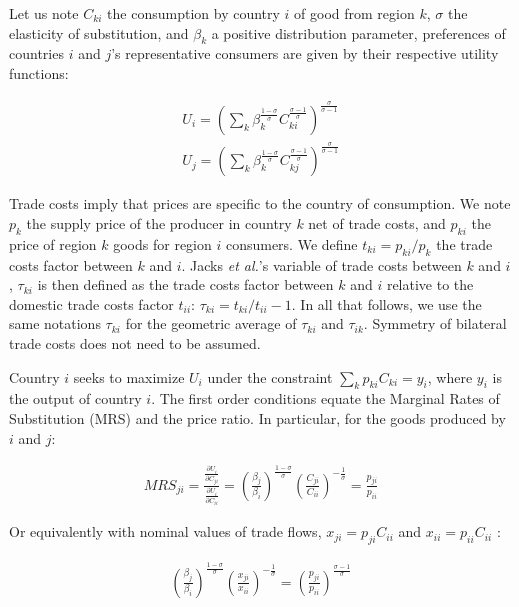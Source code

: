 \documentclass{article}
\begin{document}
Let us note $C_{ki}$ the consumption by country $i$ of good from
region $k$, $\sigma$ the elasticity of substitution, and
$\beta_k$ a positive distribution parameter, preferences of
countries $i$ and $j$'s representative consumers are given by
their respective utility functions:

\begin{eqnarray*}
U_i=\left(\sum_k\beta_{k}^{\frac{1-\sigma}{\sigma}}C_{ki}^{\frac{\sigma-1}{\sigma}}\right)^{\frac{\sigma}{\sigma-1}}\\
U_j=\left(\sum_k\beta_{k}^{\frac{1-\sigma}{\sigma}}C_{kj}^{\frac{\sigma-1}{\sigma}}\right)^{\frac{\sigma}{\sigma-1}}
\end{eqnarray*}

Trade costs imply that prices are specific to the country of
consumption. We note $p_k$ the supply price of the producer in
country $k$ net of trade costs, and $p_{ki}$ the price of
region $k$ goods for region $i$ consumers. We define
$t_{ki}=p_{ki}/p_{k}$ the trade costs factor between $k$ and
$i$. Jacks \textit{et al.}'s variable of trade costs between $k$ and
$i$, $\tau_{ki}$ is then defined as the trade costs factor
between $k$ and $i$ relative to the domestic trade costs factor
$t_{ii}$: $\tau_{ki}=t_{ki}/t_{ii}-1$. In all that follows, we
use the same notations $\tau_{ki}$ for the geometric average of
$\tau_{ki}$ and $\tau_{ik}$. Symmetry of bilateral trade costs
does not need to be assumed.

Country $i$ seeks to maximize $U_i$ under the constraint
$\sum_k p_{ki} C_{ki}=y_i$, where $y_i$ is the output of
country $i$. The first order conditions equate the Marginal
Rates of Substitution (MRS) and the price ratio. In particular,
for the goods produced by $i$ and $j$:

\begin{eqnarray*}
MRS_{ji}=\frac{\frac{\partial U_i}{\partial C_{ji}}}{\frac{\partial
U_i}{\partial C_{ii}}}=
\left(\frac{\beta_j}{\beta_i}\right)^{\frac{1-\sigma}{\sigma}}\left(\frac{C_{ji}}{C_{ii}}\right)^{-\frac{1}{\sigma}}=\frac{p_{ji}}{p_{ii}}
\end{eqnarray*}

Or equivalently with nominal values of trade flows,
$x_{ji}=p_{ji}C_{ii}$ and $x_{ii}=p_{ii}C_{ii}$ :

\begin{eqnarray*}
\left(\frac{\beta_j}{\beta_i}\right)^{\frac{1-\sigma}{\sigma}}\left(\frac{x_{ji}}{x_{ii}}\right)^{-\frac{1}{\sigma}}=\left(\frac{p_{ji}}{p_{ii}}\right)^{\frac{\sigma-1}{\sigma}}
\end{eqnarray*}
\end{document}
